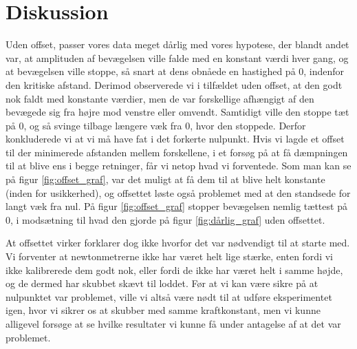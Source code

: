 \chapter{Diskussion}
Uden offset, passer vores data meget dårlig med vores hypotese, der blandt andet var, 
at amplituden af bevægelsen ville falde med en konstant værdi hver gang, og at bevægelsen ville stoppe, 
så snart at dens obnåede en hastighed på 0, indenfor den kritiske afstand. 
Derimod observerede vi i tilfældet uden offset, at den godt nok faldt med konstante værdier, men de var forskellige afhængigt af den bevægede sig fra højre mod venstre eller omvendt.
Samtidigt ville den stoppe tæt på 0, og så svinge tilbage længere væk fra 0, hvor den stoppede. Derfor konkluderede vi at vi må have fat i det forkerte nulpunkt. 
Hvis vi lagde et offset til der minimerede afstanden mellem forskellene, i et forsøg på at få dæmpningen til at blive ens i begge retninger, får vi netop hvad vi forventede. 
Som man kan se på figur \ref{fig:offset_graf}, var det muligt at få dem til at blive helt konstante (inden for usikkerhed), og offsettet løste også problemet med at den standsede for langt væk fra nul. 
På figur \ref{fig:offset_graf} stopper bevægelsen nemlig tættest på 0, i modsætning til hvad den gjorde på figur \ref{fig:dårlig_graf} uden offsettet.

At offsettet virker forklarer dog ikke hvorfor det var nødvendigt til at starte med. Vi forventer at newtonmetrerne ikke har været helt lige stærke, 
enten fordi vi ikke kalibrerede dem godt nok, eller fordi de ikke har været helt i samme højde, og de dermed har skubbet skævt til loddet.
Før at vi kan være sikre på at nulpunktet var problemet, ville vi altså være nødt til at udføre eksperimentet igen, hvor vi sikrer os at skubber med samme kraftkonstant, 
men vi kunne alligevel forsøge at se hvilke resultater vi kunne få under antagelse af at det var problemet. 